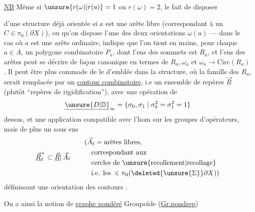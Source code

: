 \uline{NB} Même si $\unsure{r(\omega)|r(a)}=1$ ou $r(\omega)=2$, le fait de disposer

d'une structure déjà orientée si $a$ est une arête libre (correspondant à un $C\in\pi_{0}(\partial X)$), ou qu'on dispose  l'une des deux orientations $\omega(a)$ --- dans le cas où $a$ est une arête ordinaire, indique que l'on tient en mains, pour chaque $a\in A$, un polygone combinatoire $P_a$, dont l'ens des sommets est $R_a$, et l'ens des arêtes peut se décrire  de façon canonique en termes de $R_a,\omega_a$ et $\omega_a\longrightarrow\mathrm{Circ}(R_a)$. Il peut être plus commode de le  d'emblée dans la structure, où la famille des $R_a$, serait remplacée par un  \uline{contour combinatoire}, i.e un ensemble de repères $\underline{\vec R}$ (plutôt ``repères de rigidification''), avec une opération de
\[
\underline{\unsure{D|\mathbb D}}_{\infty}
=\{\sigma_{0},\sigma_{1}\mid\sigma_{0}^{2}=\sigma_{1}^{2}=1\}
\]
dessus, et une application
compatible avec l'hom
sur les groupes d'opérateurs, mais de plus un sous ens
\[
\underline{\vec R}_{\ell}^{+}\subset\underline{\vec R}|\,\vec A_{\ell}
\qquad
\begin{aligned}
&(\vec A_{\ell}=\text{arêtes libres,}\\
&\quad\text{correspondant aux}\\
&\quad\text{cercles de \unsure{recollement|recollage}}\\
&\quad\text{i.e. les }\in\pi_0(\deleted{\unsure{\Sigma}}\partial X))
\end{aligned}
\]
définissant une orientation des contours .

On a ainsi la notion de \uline{graphe pondéré}  
Groupoïde (\uline{Gr.pondrep})

